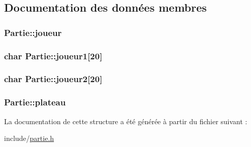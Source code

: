 \subsection{\-Documentation des données membres}
\hypertarget{structPartie_a8b5c0c007da53d6d723f4300a1d9d4ad}{
\subsubsection[{joueur}]{ {\bf \-Partie\-::joueur}}}\label{structPartie_a8b5c0c007da53d6d723f4300a1d9d4ad}
\hypertarget{structPartie_a42905bbdce5ccfd367a1b4195a433e01}{
\subsubsection[{joueur1}]{\setlength{\rightskip}{0pt plus 5cm}char {\bf \-Partie\-::joueur1}\mbox{[}20\mbox{]}}}\label{structPartie_a42905bbdce5ccfd367a1b4195a433e01}
\hypertarget{structPartie_a90dd0f2162050b2f3169dcb860d975cf}{
\subsubsection[{joueur2}]{\setlength{\rightskip}{0pt plus 5cm}char {\bf \-Partie\-::joueur2}\mbox{[}20\mbox{]}}}\label{structPartie_a90dd0f2162050b2f3169dcb860d975cf}
\hypertarget{structPartie_ae8a9b67f286f8bfd3e3a574f0ac2ac67}{
\subsubsection[{plateau}]{ {\bf \-Partie\-::plateau}}}\label{structPartie_ae8a9b67f286f8bfd3e3a574f0ac2ac67}


\-La documentation de cette structure a été générée à partir du fichier suivant \-:\begin{DoxyCompactItemize}
\item 
include/\hyperlink{partie_8h}{partie.\-h}\end{DoxyCompactItemize}
